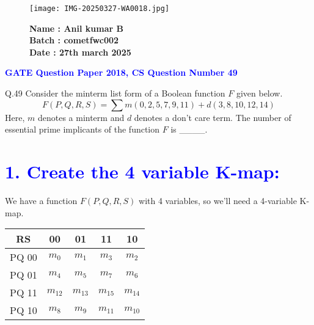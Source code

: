 \documentclass{article}
\begin{document}
\pagestyle{empty} %

\begin{figure}[h!]
    \begin{minipage}{0.45\textwidth}  %
        \texttt{[image: IMG-20250327-WA0018.jpg]}  %
    \end{minipage} \hfill
    \begin{minipage}{0.45\textwidth}  %
        \textbf{Name : Anil kumar B} \\
    \textbf{Batch : cometfwc002} \\
  \textbf{Date : 27th march 2025} 
    \end{minipage}
\end{figure}
\begin{center}
    {\LARGE \textbf{\textcolor{blue}{GATE Question Paper 2018, CS Question Number 49}}}
\end{center}

 
Q.49 Consider the minterm list form of a Boolean function \( F \) given below.
\[
F(P, Q, R, S) = \sum m(0, 2, 5, 7, 9, 11) + d(3, 8, 10, 12, 14)
\]
Here, \( m \) denotes a minterm and \( d \) denotes a don't care term. The number of essential prime implicants of the function \( F \) is \_\_\_\_.
\begin{center}
    {\LARGE \texfot{\textcolor{blue}{ANSWER}}}
\end{center}
\section*{\textbf{\textcolor{blue}{1. Create the 4 variable K-map:}}}

We have a function $F(P, Q, R, S)$ with 4 variables, so we'll need a 4-variable K-map.

\begin{center}
\begin{tabular}{|c|c|c|c|c|}
\hline
\multicolumn{1}{|c|}{RS} & 00 & 01 & 11 & 10 \\ \hline
PQ 00 & $m_0$ & $m_1$ & $m_3$ & $m_2$ \\ \hline
PQ 01 & $m_4$ & $m_5$ & $m_7$ & $m_6$ \\ \hline
PQ 11 & $m_{12}$ & $m_{13}$ & $m_{15}$ & $m_{14}$ \\ \hline
PQ 10 & $m_8$ & $m_9$ & $m_{11}$ & $m_{10}$ \\ \hline
\end{tabular}
\end{center}
\end{document}
